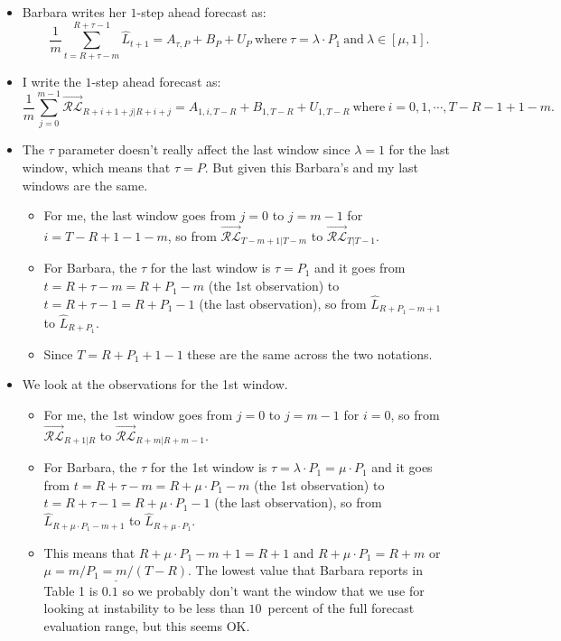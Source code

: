 \documentclass[11pt]{article}
\begin{document}
\begin{itemize}
\begin{itemize}
\item Barbara writes her $1$-step ahead forecast as: 
\[\frac{1}{m}\sum_{t=R+\tau-m}^{R+\tau-1}\widehat{L}_{t+1}=A_{\tau,P}\!+\!B_{P}\!+\!U_{P} \ \mathrm{where} \  \tau=\lambda\cdot P_{1} \ \mathrm{and} \  \lambda\in[\mu,1].
\]
\item I write the $1$-step ahead forecast as: 
\[\frac{1}{m}\sum_{j=0}^{m-1}\overrightarrow{\mathcal{RL}}_{R+i+1+j|R+i+j}=A_{1,i,T-R}+B_{1,T-R}+U_{1,T-R} \ \mathrm{where}\  i=0,1,\cdots,T-R-1+1-m.
\]
\item The $\tau$ parameter doesn't really affect the last window since $\lambda=1$ for the last window, which means that $\tau=P$. But given this Barbara's and my last windows are the same.
\begin{itemize}
\item For me, the last window goes from $j=0$ to $j=m-1$ for $i=T-R+1-1-m$, so from $\overrightarrow{\mathcal{RL}}_{T-m+1|T-m}$ to $\overrightarrow{\mathcal{RL}}_{T|T-1}$.
\item For Barbara, the $\tau$ for the last window is $\tau=P_{1}$ and it goes from $t=R+\tau-m=R+P_{1}-m$ (the 1st observation) to $t=R+\tau-1=R+P_{1}-1$ (the last observation), so from $\widehat{L}_{R+P_{1}-m+1}$ to $\widehat{L}_{R+P_{1}}$.
\item Since $T=R+P_{1}+1-1$ these are the same across the two notations.
\end{itemize}
\item We look at the observations for the 1st window. 
\begin{itemize}
\item For me, the 1st window goes from $j=0$ to $j=m-1$ for $i=0$, so from
$\overrightarrow{\mathcal{RL}}_{R+1|R}$ to $\overrightarrow{\mathcal{RL}}_{R+m|R+m-1}$.
\item For Barbara, the $\tau$ for the 1st window is $\tau=\lambda\cdot P_{1}=\mu\cdot P_{1}$ and it goes from $t=R+\tau-m=R+\mu\cdot P_{1}-m$ (the 1st observation) to $t=R+\tau-1=R+\mu\cdot P_{1}-1$ (the last observation), so from $\widehat{L}_{R+\mu\cdot P_{1}-m+1}$ to $\widehat{L}_{R+\mu\cdot P_{1}}$.
\item This means that $R+\mu\cdot P_{1}-m+1=R+1$ and $R+\mu\cdot P_{1}=R+m$ or $\underline{\mu=m/P_{1}=m/(T-R)}$.  The lowest value that Barbara reports in Table 1 is $0.1$ so we probably don't want the window that we use for looking at instability to be less than $10$~percent of the full forecast evaluation range, but this seems OK.
\end{itemize}

\end{itemize}
\end{itemize}
\end{document}
